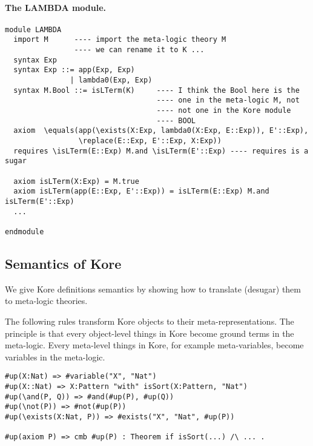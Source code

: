 \documentclass[UTF8]{article}
\theoremstyle{plain}
\theoremstyle{definition}
\theoremstyle{remark}
\begin{document}
\paragraph{The {\small LAMBDA} module.}\quad
\begin{Verbatim}
module LAMBDA
  import M      ---- import the meta-logic theory M
                ---- we can rename it to K ...
  syntax Exp
  syntax Exp ::= app(Exp, Exp)
               | lambda0(Exp, Exp)
  syntax M.Bool ::= isLTerm(K)     ---- I think the Bool here is the
                                   ---- one in the meta-logic M, not
                                   ---- not one in the Kore module 
                                   ---- BOOL
  axiom  \equals(app(\exists(X:Exp, lambda0(X:Exp, E::Exp)), E'::Exp),
                 \replace(E::Exp, E'::Exp, X:Exp))
  requires \isLTerm(E::Exp) M.and \isLTerm(E'::Exp) ---- requires is a sugar
  
  axiom isLTerm(X:Exp) = M.true
  axiom isLTerm(app(E::Exp, E'::Exp)) = isLTerm(E::Exp) M.and isLTerm(E'::Exp)
  ...
      
endmodule
\end{Verbatim}

\subsection{Semantics of Kore}

We give Kore definitions semantics by showing how to translate (desugar) them to meta-logic theories. 


The following rules transform Kore objects to their meta-representations. The principle is that every object-level things in Kore become ground terms in the meta-logic. Every meta-level things in Kore, for example meta-variables, become variables in the meta-logic. 

\begin{Verbatim}
#up(X:Nat) => #variable("X", "Nat")
#up(X::Nat) => X:Pattern "with" isSort(X:Pattern, "Nat")
#up(\and(P, Q)) => #and(#up(P), #up(Q))
#up(\not(P)) => #not(#up(P))
#up(\exists(X:Nat, P)) => #exists("X", "Nat", #up(P))

#up(axiom P) => cmb #up(P) : Theorem if isSort(...) /\ ... .

\end{Verbatim} 
\end{document}
